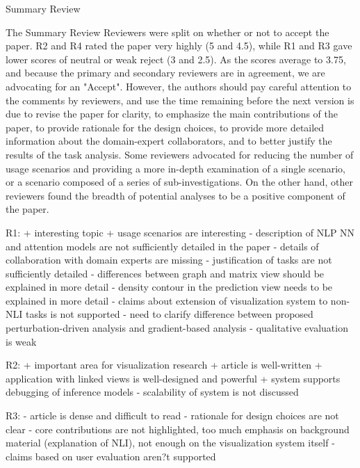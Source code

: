 Summary Review

The Summary Review
Reviewers were split on whether or not to accept the paper. R2 and R4 rated the paper very highly (5 and 4.5), while R1 and R3 gave lower scores of neutral or weak reject (3 and 2.5). As the scores average to 3.75, and because the primary and secondary reviewers are in agreement, we are advocating for an "Accept". However, the authors should pay careful attention to the comments by reviewers, and use the time remaining before the next version is due to revise the paper for clarity, to emphasize the main contributions of the paper, to provide rationale for the design choices, to provide more detailed information about the domain-expert collaborators, and to better justify the results of the task analysis. Some reviewers advocated for reducing the number of usage scenarios and providing a more in-depth examination of a single scenario, or a scenario composed of a series of sub-investigations. On the other hand, other reviewers found the breadth of potential analyses to be a positive component of the paper. 

R1:
+ interesting topic
+ usage scenarios are interesting
- description of NLP NN and attention models are not sufficiently detailed in the paper
- details of collaboration with domain experts are missing
- justification of tasks are not sufficiently detailed
- differences between graph and matrix view should be explained in more detail
- density contour in the prediction view needs to be explained in more detail
- claims about extension of visualization system to non-NLI tasks is not supported
- need to clarify difference between proposed perturbation-driven analysis and gradient-based analysis
- qualitative evaluation is weak

R2:
+ important area for visualization research
+ article is well-written
+ application with linked views is well-designed and powerful
+ system supports debugging of inference models
- scalability of system is not discussed

R3: 
- article is dense and difficult to read
- rationale for design choices are not clear
- core contributions are not highlighted, too much emphasis on background material (explanation of NLI), not enough on the visualization system itself
- claims based on user evaluation aren?t supported

